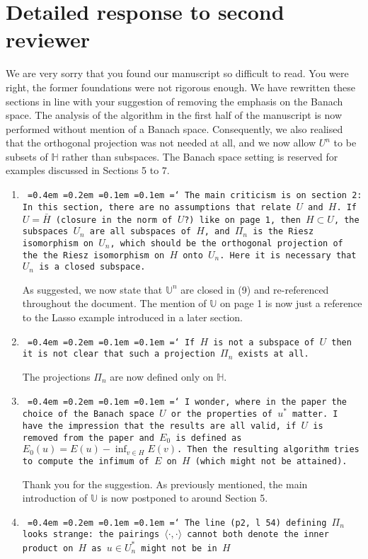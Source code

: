 \documentclass[12pt]{article}
\newcommand*\justify{%
	\fontdimen2\font=0.4em%
	\fontdimen3\font=0.2em%
	\fontdimen4\font=0.1em%
	\fontdimen7\font=0.1em%
	\hyphenchar\font=`\-%
}
\newcommand{\review}[1]{\texttt{\justify{#1}}}
\newcommand{\F}[1]{\mathbb{#1}}
\begin{document}
\section{Detailed response to second reviewer}
We are very sorry that you found our manuscript so difficult to read. You were right, the former foundations were not rigorous enough. We have rewritten these sections in line with your suggestion of removing the emphasis on the Banach space. The analysis of the algorithm in the first half of the manuscript is now performed without mention of a Banach space. Consequently, we also realised that the orthogonal projection was not needed at all, and we now allow $U^n$ to be subsets of $\F H$ rather than subspaces. The Banach space setting is reserved for examples discussed in Sections 5 to 7.

\begin{enumerate}
	\item \review{The main criticism is on section 2: In this section, there are no assumptions that relate $U$ and $H$. If $U=\bar{H}$ (closure in the norm of $U$?) like on page 1, then $H\subset U$, the subspaces $U_n$ are all subspaces of $H$, and $\Pi_n$ is the Riesz isomorphism on $U_n$, which should be the orthogonal projection of the the Riesz isomorphism on $H$ onto $U_n$. Here it is necessary that $U_n$ is a closed subspace.}
	
	As suggested, we now state that $\F U^n$ are closed in (9) and re-referenced throughout the document. The mention of $\F U$ on page 1 is now just a reference to the Lasso example introduced in a later section.
	
	\item \review{If $H$ is not a subspace of $U$ then it is not clear that such a projection $\Pi_n$ exists at all.}
	
	The projections $\Pi_n$ are now defined only on $\F H$.
	
	\item \review{I wonder, where in the paper the choice of the Banach space $U$ or the properties of $u^*$ matter. I have the impression that the results are all valid, if $U$ is removed from the paper and $E_0$ is defined as $E_0(u)=E(u)-\inf_{v\in H}E(v)$. Then the resulting algorithm tries to compute the infimum of $E$ on $H$ (which might not be attained).}
	
	Thank you for the suggestion. As previously mentioned, the main introduction of $\F U$ is now postponed to around Section 5.
	
	\item \review{The line (p2, l 54) defining $\Pi_n$ looks strange: the pairings $\langle\cdot,\cdot\rangle$ cannot both denote the inner product on $H$ as $u\in U_n^*$ might not be in $H$}


\end{enumerate}
\end{document}
